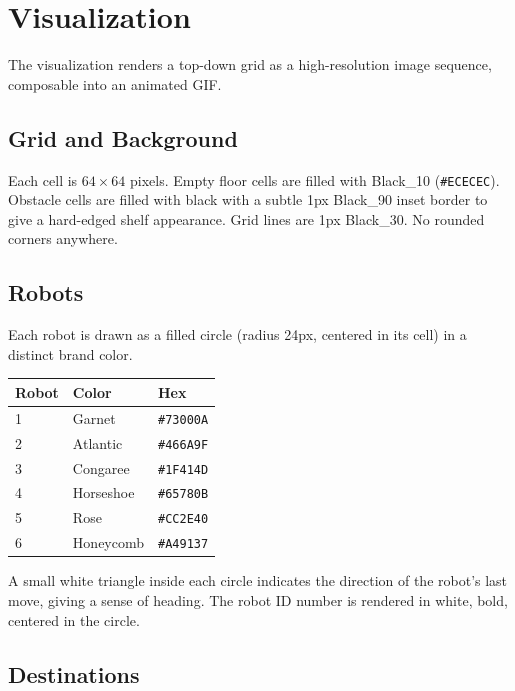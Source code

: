 \documentclass[11pt]{article}
\begin{document}
\section{Visualization}

The visualization renders a top-down grid as a high-resolution image sequence, composable into an animated GIF.

\subsection{Grid and Background}

Each cell is $64 \times 64$ pixels. Empty floor cells are filled with \textcolor{Black10}{Black\_10} (\texttt{\#ECECEC}). Obstacle cells are filled with black with a subtle 1px \textcolor{Black90}{Black\_90} inset border to give a hard-edged shelf appearance. Grid lines are 1px \textcolor{Black30}{Black\_30}. No rounded corners anywhere.

\subsection{Robots}

Each robot is drawn as a filled circle (radius 24px, centered in its cell) in a distinct brand color.

\begin{table}[h]
\centering
\begin{tabular}{lll}
\toprule
Robot & Color & Hex \\
\midrule
1 & \textcolor{Garnet}{Garnet} & \texttt{\#73000A} \\
2 & \textcolor{Atlantic}{Atlantic} & \texttt{\#466A9F} \\
3 & \textcolor{Congaree}{Congaree} & \texttt{\#1F414D} \\
4 & \textcolor{Horseshoe}{Horseshoe} & \texttt{\#65780B} \\
5 & \textcolor{Rose}{Rose} & \texttt{\#CC2E40} \\
6 & \textcolor{Honeycomb}{Honeycomb} & \texttt{\#A49137} \\
\bottomrule
\end{tabular}
\end{table}

A small white triangle inside each circle indicates the direction of the robot's last move, giving a sense of heading. The robot ID number is rendered in white, bold, centered in the circle.

\subsection{Destinations}
\end{document}
